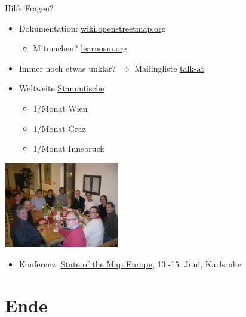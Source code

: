 \documentclass{beamer}
\begin{document}
\begin{frame}{Hilfe}
Fragen? 
\begin{itemize}
  \item Dokumentation: \href{http://wiki.openstreetmap.org}{wiki.openstreetmap.org}
  \begin{itemize} 
    \item Mitmachen? \href{http://learnosm.org/}{learnosm.org}
  \end{itemize}
  \item Immer noch etwas unklar? $\Rightarrow$ Mailingliste \href{http://lists.openstreetmap.org/listinfo/talk-at}{talk-at}
  \item Weltweite \href{http://usergroups.openstreetmap.de/}{Stammtische}
  \begin{itemize}
    \item 1/Monat Wien
    \item 1/Monat Graz
    \item 1/Monat Innsbruck
  \end{itemize}

\end{itemize}

 \vspace*{-2.0cm}
\hfill\includegraphics[width=5cm]{Salzburg_stammtisch.jpg}

\begin{itemize}
  \item Konferenz: \href{http://sotm-eu.org/}{State of the Map Europe}, 13.-15. Juni, Karlsruhe
\end{itemize}
\end{frame}

\section{Ende}
\end{document}
